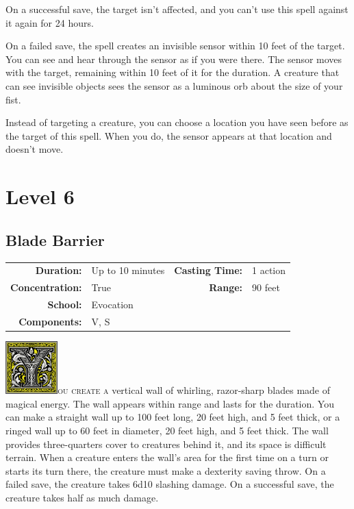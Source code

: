 \documentclass[12pt,showtrims]{memoir}
\begin{document}
On a successful save, the target isn’t affected, and you can’t use this spell against it again for 24 hours.

On a failed save, the spell creates an invisible sensor within 10 feet of the target. You can see and hear through the sensor as if you were there. The sensor moves with the target, remaining within 10 feet of it for the duration. A creature that can see invisible objects sees the sensor as a luminous orb about the size of your fist.

Instead of targeting a creature, you can choose a location you have seen before as the target of this spell. When you do, the sensor appears at that location and doesn’t move.




\newpage
\chapter*{Level 6} 
\section*{Blade Barrier}

{
\small\centering\vspace{-6pt}
\begin{tabular}{rlrl}
\toprule

\textbf{Duration:} & Up to 10 minutes &
\textbf{Casting Time:} & 1 action \\
\textbf{Concentration:} & True &
\textbf{Range:} & 90 feet \\
\textbf{School:} & Evocation \\
\textbf{Components:} & \multicolumn{3}{p{0.7\textwidth}}{V, S}\\

\bottomrule
\end{tabular}
}

\vspace{1\baselineskip}\noindent
\lettrine[lines=4]{\includegraphics[height=58pt]{initials/Y.png}}{ou create a} vertical wall of whirling, razor-sharp blades made of magical energy. The wall appears within range and lasts for the duration. You can make a straight wall up to 100 feet long, 20 feet high, and 5 feet thick, or a ringed wall up to 60 feet in diameter, 20 feet high, and 5 feet thick. The wall provides three-quarters cover to creatures behind it, and its space is difficult terrain. When a creature enters the wall's area for the first time on a turn or starts its turn there, the creature must make a dexterity saving throw. On a failed save, the creature takes 6d10 slashing damage. On a successful save, the creature takes half as much damage.
\end{document}

